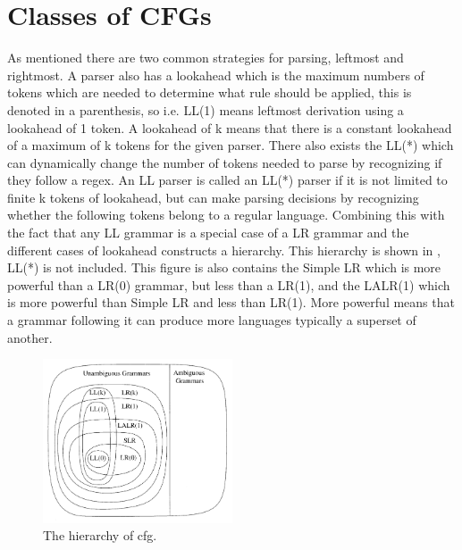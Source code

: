 \section{Classes of CFGs}
As mentioned there are two common strategies for parsing, leftmost and rightmost. 
A parser also has a lookahead which is the maximum numbers of tokens which are needed to determine what rule should be applied, this is denoted in a parenthesis, so i.e. LL(1) means leftmost derivation using a lookahead of 1 token. 
A lookahead of k means that there is a constant lookahead of a maximum of k tokens for the given parser. 
There also exists the LL(*) which can dynamically change the number of tokens needed to parse by recognizing if they follow a \acrshort{regex}.
An LL parser is called an LL(*) parser if it is not limited to finite k tokens of lookahead, but can make parsing decisions by recognizing whether the following tokens belong to a regular language.
Combining this with the fact that any LL grammar is a special case of a LR grammar and the different cases of lookahead constructs a hierarchy. 
This hierarchy is shown in , LL(*) is not included.
This figure is also contains the Simple LR which is more powerful than a LR(0) grammar, but less than a LR(1), and the LALR(1) which is more powerful than Simple LR and less than LR(1).
More powerful means that a grammar following it can produce more languages typically a superset of another. 
\begin{figure}[!ht]
\centering
 \includegraphics[width=0.5\textwidth]{figures/classesofgrammars.png} %
\caption{The hierarchy of \acrlong{cfg}. \citep{NvidiaCUDASeminar} }\label{image:hierarchyofgrammars}
\vspace{-15pt}
\end{figure}
